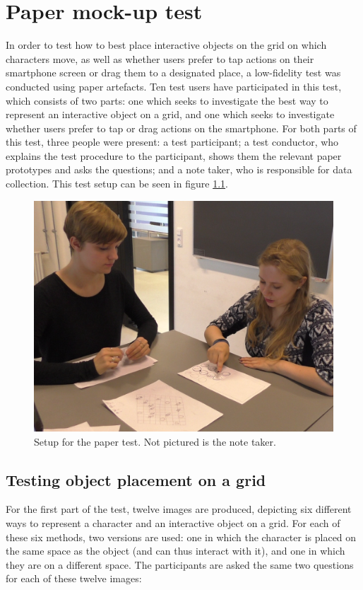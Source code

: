 \chapter{Paper mock-up test}\label{ch:papertest}
In order to test how to best place interactive objects on the grid on which characters move, as well as whether users prefer to tap actions on their smartphone screen or drag them to a designated place, a low-fidelity test was conducted using paper artefacts. Ten test users have participated in this test, which consists of two parts: one which seeks to investigate the best way to represent an interactive object on a grid, and one which seeks to investigate whether users prefer to tap or drag actions on the smartphone. For both parts of this test, three people were present: a test participant; a test conductor, who explains the test procedure to the participant, shows them the relevant paper prototypes and asks the questions; and a note taker, who is responsible for data collection. This test setup can be seen in figure \ref{fig:papersetup}.

\begin{figure}[h!]
	\centering
	\includegraphics[width=\textwidth / 2]{figures/PaperTestSetup.png}
	\caption{Setup for the paper test. Not pictured is the note taker. \label{fig:papersetup}}
\end{figure}

\section{Testing object placement on a grid}
For the first part of the test, twelve images are produced, depicting six different ways to represent a character and an interactive object on a grid. For each of these six methods, two versions are used: one in which the character is placed on the same space as the object (and can thus interact with it), and one in which they are on a different space. The participants are asked the same two questions for each of these twelve images:

